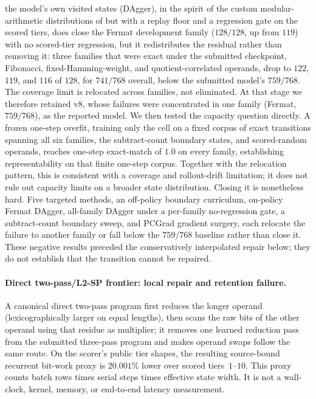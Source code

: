\documentclass[11pt]{article}
\begin{document}
the model's own visited states (DAgger), in the spirit of the custom modular-arithmetic
distributions of \citet{saxena2024modarith} but with a replay floor and a regression
gate on the scored tiers, does close the Fermat development family ($128/128$, up from
$119$) with no scored-tier regression, but it redistributes the residual rather than
removing it: three families that were exact under the submitted checkpoint, Fibonacci,
 fixed-Hamming-weight, and quotient-correlated operands, drop to $122$, $119$, and $116$ of $128$,
for $741/768$ overall, below the submitted model's $759/768$. The coverage limit is
relocated across families, not eliminated. At that stage we therefore retained v8,
whose failures were concentrated in one family (Fermat, $759/768$), as the reported model.
We then tested the capacity question directly. A frozen one-step overfit, training
only the cell on a fixed corpus of exact transitions spanning all six families, the
subtract-count boundary states, and scored-random operands, reaches one-step
exact-match of $1.0$ on every family, establishing representability on that finite
one-step corpus. Together with the relocation pattern, this is consistent with a
coverage and rollout-drift limitation; it does not rule out capacity limits on a
broader state distribution. Closing it is
nonetheless hard. Five targeted methods, an off-policy boundary curriculum, on-policy
Fermat DAgger, all-family DAgger under a per-family no-regression gate, a subtract-count
boundary sweep, and PCGrad gradient surgery, each relocate the failure to another
family or fall below the $759/768$ baseline rather than close it. These negative
results preceded the conservatively interpolated repair below; they do not establish that
the transition cannot be repaired.

\paragraph{Direct two-pass/L2-SP frontier: local repair and retention failure.}
A canonical direct two-pass program first reduces the longer operand
(lexicographically larger on equal lengths), then scans the raw bits of the other
operand using that residue as multiplier;
it removes one learned reduction pass from the submitted three-pass program and
makes operand swaps follow the same route. On the scorer's public tier shapes,
the resulting source-bound recurrent bit-work proxy is $20.001\%$ lower over
scored tiers~$1$--$10$. This proxy counts batch rows times serial steps times
effective state width. It is not a wall-clock, kernel, memory, or end-to-end
latency measurement.
\end{document}
